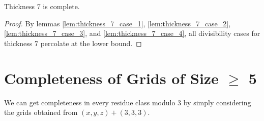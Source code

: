 \begin{lem}
Thickness 7 is complete.
\end{lem}

\begin{proof}
By lemmas \ref{lem:thickness_7_case_1}, \ref{lem:thickness_7_case_2}, \ref{lem:thickness_7_case_3}, and \ref{lem:thickness_7_case_4}, all divisibility cases for thickness 7 percolate at the lower bound.
\end{proof}

\section{Completeness of Grids of Size $\geq$ 5}

We can get completeness in every residue class modulo 3 by simply considering the grids obtained from $(x,y,z)+(3,3,3)$.




